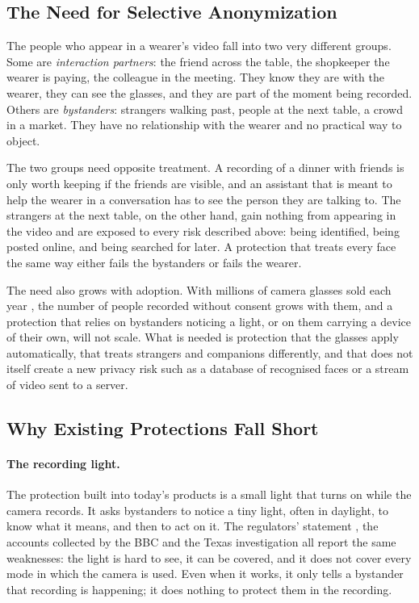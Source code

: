 \subsection{The Need for Selective Anonymization}
\label{sec:need}

The people who appear in a wearer's video fall into two very different groups. Some are
\emph{interaction partners}: the friend across the table, the shopkeeper the wearer is
paying, the colleague in the meeting. They know they are with the wearer, they can see the
glasses, and they are part of the moment being recorded. Others are \emph{bystanders}:
strangers walking past, people at the next table, a crowd in a market. They have no
relationship with the wearer and no practical way to object.

The two groups need opposite treatment. A recording of a dinner with friends is only
worth keeping if the friends are visible, and an assistant that is meant to help the
wearer in a conversation has to see the person they are talking to. The strangers at the
next table, on the other hand, gain nothing from appearing in the video and are exposed to
every risk described above: being identified, being posted online, and being searched for
later. A protection that treats every face the same way either fails the bystanders or
fails the wearer.

The need also grows with adoption. With millions of camera glasses sold each year
\cite{uploadvr2026sales}, the number of people recorded without consent grows with them,
and a protection that relies on bystanders noticing a light, or on them carrying a device
of their own, will not scale. What is needed is protection that the glasses apply
automatically, that treats strangers and companions differently, and that does not itself
create a new privacy risk such as a database of recognised faces or a stream of video sent
to a server.

\subsection{Why Existing Protections Fall Short}
\label{sec:existing}

\paragraph{The recording light.}
The protection built into today's products is a small light that turns on while the
camera records. It asks bystanders to notice a tiny light, often in daylight, to know
what it means, and then to act on it. The regulators' statement \cite{dpc2021view}, the
accounts collected by the BBC \cite{bbc2026glasses} and the Texas investigation
\cite{cbs2026texas} all report the same weaknesses: the light is hard to see, it can be
covered, and it does not cover every mode in which the camera is used. Even when it
works, it only tells a bystander that recording is happening; it does nothing to protect
them in the recording.

